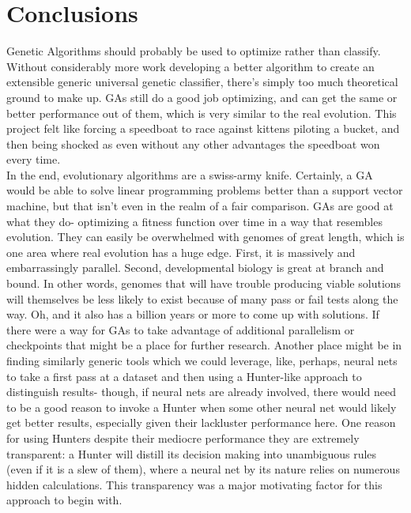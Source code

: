 \chapter{Conclusions} \label{ch:conclusion}
Genetic Algorithms should probably be used to optimize rather than classify.  Without considerably more work developing a better algorithm to create an extensible generic universal genetic classifier, there's simply too much theoretical ground to make up.  GAs still do a good job optimizing, and can get the same or better performance out of them, which is very similar to the real evolution.  This project felt like forcing a speedboat to race against kittens piloting a bucket, and then being shocked as even without any other advantages the speedboat won every time.\\In the end, evolutionary algorithms are a swiss-army knife.  Certainly, a GA would be able to solve linear programming problems better than a support vector machine, but that isn't even in the realm of a fair comparison.  GAs are good at what they do- optimizing a fitness function over time in a way that resembles evolution.  They can easily be overwhelmed with genomes of great length, which is one area where real evolution has a huge edge.  First, it is massively and embarrassingly parallel.  Second, developmental biology is great at branch and bound.  In other words, genomes that will have trouble producing viable solutions will themselves be less likely to exist because of many pass or fail tests along the way.  Oh, and it also has a billion years or more to come up with solutions.  If there were a way for GAs to take advantage of additional parallelism or checkpoints that might be a place for further research.  Another place might be in finding similarly generic tools which we could leverage, like, perhaps, neural nets to take a first pass at a dataset and then using a Hunter-like approach to distinguish results- though, if neural nets are already involved, there would need to be a good reason to invoke a Hunter when some other neural net would likely get better results, especially given their lackluster performance here.  One reason for using Hunters despite their mediocre performance they are extremely transparent: a Hunter will distill its decision making into unambiguous rules (even if it is a slew of them), where a neural net by its nature relies on numerous hidden calculations.  This transparency was a major motivating factor for this approach to begin with.\\
